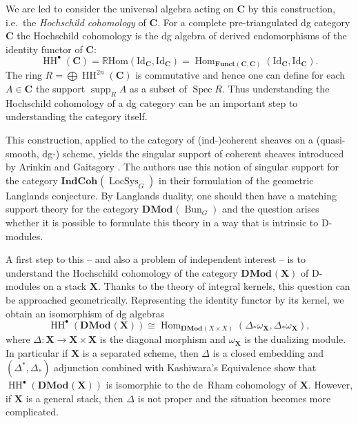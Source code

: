 \documentclass{oupau}
\theoremstyle{remark}
\DeclareMathOperator\Spec{Spec}
\let\stack\mathbf                           %
\newcommand\LocSys{\operatorname{LocSys}}   %
\newcommand\Bun{\operatorname{Bun}}         %
\newcommand\cat{\mathbf}                    %
\DeclareMathOperator\Hom{Hom}
\newcommand\id[1][]{{\mathrm{Id}_{#1}}}     %
\newcommand\cx\bullet                       %
\newcommand{\HCoh}{\operatorname{HH}^\cx}   %
\DeclareMathOperator\supp{supp}     %
\newcommand\catDMod[2][]{\cat{DMod}_{#1}(#2)}   %
\newcommand\catIndCoh[2][]{\cat{IndCoh}_{#1}(#2)} %
\begin{document}
We are led to consider the universal algebra acting on $\cat C$ by this construction, i.e.~the \emph{Hochschild cohomology} of $\cat C$.
For a complete pre-triangulated dg category $\cat C$ the Hochschild cohomology is the dg algebra of derived endomorphisms of the identity functor of $\cat C$:
\[
    \HCoh(\cat C)
    = \mathbb{R}\mathrm{Hom}(\id[\cat C], \id[\cat C])
    = \Hom_{\cat{Funct}(\cat C, \cat C)}(\id[\cat C], \id[\cat C]).
\]
The ring $R = \bigoplus \operatorname{HH}^{2n}(\cat C)$ is commutative and hence one can define for each $A ∈ \cat C$ the support $\supp_R A$ as a subset of $\Spec R$.
Thus understanding the Hochschild cohomology of a dg category can be an important step to understanding the category itself.

This construction, applied to the category of (ind-)coherent sheaves on a (quasi-smooth, dg-) scheme, yields the singular support of coherent sheaves introduced by Arinkin and Gaitsgory \cite{ArinkinGaitsgory:2015:SingularSupport}.
The authors use this notion of singular support for the category $\catIndCoh{\LocSys_G}$ in their formulation of the geometric Langlands conjecture.
By Langlands duality, one should then have a matching support theory for the category $\catDMod{\Bun_G}$ and the question arises whether it is possible to formulate this theory in a way that is intrinsic to D-modules.

A first step to this -- and also a problem of independent interest -- is to understand the Hochschild cohomology of the category $\catDMod{\stack X}$ of D-modules on a stack $\stack X$.
Thanks to the theory of integral kernels, this question can be approached geometrically.
Representing the identity functor by its kernel, we obtain an isomorphism of dg algebras
\begin{equation}
    \label{eq:intro:d-mod-hcoh}
    \HCoh(\catDMod{\stack X}) \cong \Hom_{\catDMod{X×X}}(Δ_*ω_{\stack X}, Δ_*ω_{\stack X}),
\end{equation}
where $Δ\colon \stack X \to \stack X \times \stack X$ is the diagonal morphism and $ω_{\stack X}$ is the dualizing module.
In particular if $\stack X$ is a separated scheme, then $Δ$ is a closed embedding and $(Δ^*,Δ_*)$ adjunction combined with Kashiwara's Equivalence show that $\HCoh(\catDMod{\stack X})$ is isomorphic to the de~Rham cohomology of $\stack X$.
However, if $\stack X$ is a general stack, then $Δ$ is not proper and the situation becomes more complicated.
\end{document}
